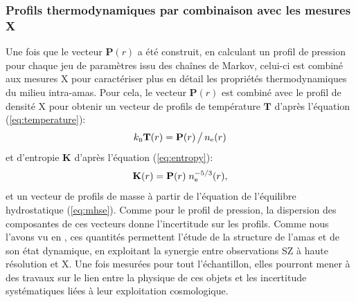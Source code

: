 \subsubsection{Profils thermodynamiques par combinaison avec les mesures X} %
\label{sec:panco:thermo_profiles_x}
Une fois que le vecteur $\mathbf{P}(r)$ a été construit, en calculant un profil de pression pour chaque jeu de paramètres issu des chaînes de Markov, celui-ci est combiné aux mesures X pour caractériser plus en détail les propriétés thermodynamiques du milieu intra-amas.
Pour cela, le vecteur $\mathbf{P}(r)$ est combiné avec le profil de densité X pour obtenir un vecteur de profils de température $\mathbf{T}$  d'après l'équation (\ref{eq:temperature}):
\begin{equation}
    k_\textsc{b} \mathbf{T}(r) = \mathbf{P}(r) \,\big/\, n_{\rm e}(r)
\end{equation}
et d'entropie $\mathbf{K}$ d'après l'équation (\ref{eq:entropy}):
\begin{equation}
    \mathbf{K}(r) = \mathbf{P}(r)\;n_{\rm e}^{-5/3}(r),
\end{equation}
et un vecteur de profils de masse à partir de l'équation de l'équilibre hydrostatique (\ref{eq:mhse}).
Comme pour le profil de pression, la dispersion des composantes de ces vecteurs donne l'incertitude sur les profils.
Comme nous l'avons vu en , ces quantités permettent l'étude de la structure de l'amas et de son état dynamique, en exploitant la synergie entre observations SZ à haute résolution et X.
Une fois mesurées pour tout l'échantillon, elles pourront mener à des travaux sur le lien entre la physique de ces objets et les incertitude systématiques liées à leur exploitation cosmologique.

